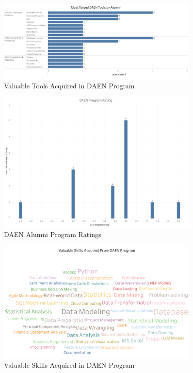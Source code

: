 \documentclass[12pt,a4paper]{article}
\begin{document}
\begin{figure}[H]
    \centering
    \includegraphics[width=0.9\textwidth]{visualizations/daen-tools.png}
    \caption{Valuable Tools Acquired in DAEN Program}
    \label{fig:daen-tools}
\end{figure}

\begin{figure}[H]
    \centering
    \includegraphics[width=0.9\textwidth]{visualizations/daen-rating.png}
    \caption{DAEN Alumni Program Ratings}
    \label{fig:daen-rating}
\end{figure}

\begin{figure}[H]
    \centering
    \includegraphics[width=0.9\textwidth]{visualizations/program-skills.png}
    \caption{Valuable Skills Acquired in DAEN Program}
    \label{fig:program-skills}
\end{figure}
\end{document}
